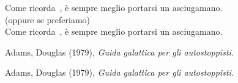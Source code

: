 \documentclass{book}
\begin{document}
Come ricorda~\cite{adams:guida}, è sempre meglio portarsi un asciugamano.
\\
(oppure se preferiamo)
\\
Come ricorda~\cite{adams:guida2}, è sempre meglio portarsi un asciugamano.

\cleardoublepage
{}


\begin{thebibliography}{9}

 Adams, Douglas (1979), \emph{Guida galattica per gli autostoppisti}.

 Adams, Douglas (1979), \emph{Guida galattica per gli autostoppisti}.

\end{thebibliography}
\end{document}
